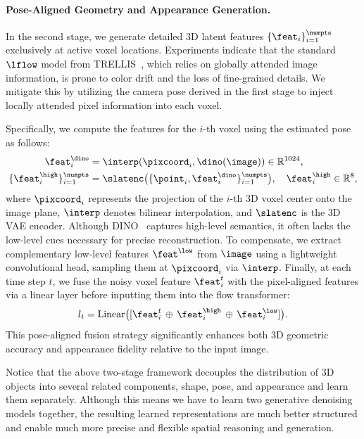 \documentclass[../../book-main.tex]{subfiles}
\begin{document}
\paragraph{Pose-Aligned Geometry and Appearance Generation.}
In the second stage, we generate detailed 3D latent features $\{
\feat_i \}_{i=1}^{\numpts}$ exclusively at active voxel locations.
Experiments indicate that the standard $\lflow$ model from
TRELLIS~\citep{xiang2025structured}, which relies on globally
attended image information, is prone to color drift and the loss of
fine-grained details. We mitigate this by utilizing the camera pose
derived in the first stage to inject locally attended pixel
information into each voxel.

Specifically, we compute the features for the $i$-th voxel using the
estimated pose as follows:
\begin{equation}
\begin{aligned}
\feat^\dino_{i} &= \interp(\pixcoord_i, \dino(\image)) \in \mathbb{R}^{1024}, \\
\{\feat^{\high}_{i}\}_{i=1}^{\numpts} &= \slatenc\big(\{\point_i,
\feat^\dino_i\}_{i=1}^{\numpts}\big), \quad \feat^{\high}_{i} \in
\mathbb{R}^{8},
\end{aligned}
\label{eq:latent}
\end{equation}
where $\pixcoord_i$ represents the projection of the $i$-th 3D voxel
center onto the image plane, $\interp$ denotes bilinear
interpolation, and $\slatenc$ is the 3D VAE encoder. Although
DINO~\citep{oquab2023dinov2} captures high-level semantics, it often
lacks the low-level cues necessary for precise reconstruction. To
compensate, we extract complementary low-level features
$\feat^{\low}$ from $\image$ using a lightweight convolutional head,
sampling them at $\pixcoord_i$ via $\interp$. Finally, at each time
step $t$, we fuse the noisy voxel feature $\feat_i^{t}$ with the
pixel-aligned features via a linear layer before inputting them into
the flow transformer:
\begin{equation}
l_t = \mathrm{Linear}\big([\feat_i^{t}\,\oplus\, \feat^{\high}_{i}
\,\oplus\, \feat^{\low}_{i}]\big).
\end{equation}
This pose-aligned fusion strategy significantly enhances both 3D
geometric accuracy and appearance fidelity relative to the input image.

\begin{remark}
Notice that the above two-stage framework decouples the distribution
of 3D objects into several related components, shape, pose, and
appearance and learn them separately. Although this means we have to
learn two generative denoising models together, the resulting learned
representations are much better structured and enable much more
precise and flexible spatial reasoning and generation.
\end{remark}
\end{document}
